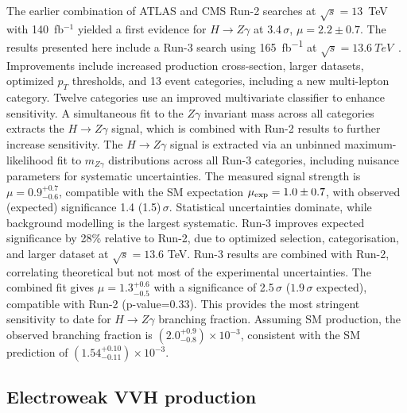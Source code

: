 \documentclass[a4paper,11pt]{article}
\begin{document}
The earlier combination of ATLAS and CMS Run-2 searches at
$\sqrt{s}=13$~TeV with 140~fb$^{-1}$ yielded a first evidence for $H
\to Z\gamma$ at 3.4\,$\sigma$, $\mu = 2.2 \pm 0.7$. The results
presented here include a Run-3 search using \SI{165}{fb^{-1}} at
$\sqrt{s}=\SI{13.6}{TeV}$~\cite{hzgamma-atlas}. Improvements include
increased production cross-section, larger datasets, optimized $p_T$
thresholds, and 13 event categories, including a new multi-lepton
category. Twelve categories use an improved multivariate classifier to
enhance sensitivity. A simultaneous fit to the $Z\gamma$ invariant
mass across all categories extracts the $H \to Z\gamma$ signal, which
is combined with Run-2 results to further increase sensitivity.
%
The $H\to Z\gamma$ signal is extracted via an unbinned
maximum-likelihood fit to $m_{Z\gamma}$ distributions across all Run-3
categories, including nuisance parameters for systematic
uncertainties.  The measured signal strength is $\mu =
0.9^{+0.7}_{-0.6}$, compatible with the SM expectation $\mu_{\rm exp}
= 1.0\pm0.7$, with observed (expected) significance 1.4
(1.5)\,$\sigma$.  Statistical uncertainties dominate, while background
modelling is the largest systematic.  Run-3 improves expected
significance by 28\% relative to Run-2, due to optimized selection,
categorisation, and larger dataset at $\sqrt{s}=13.6$ TeV.  Run-3
results are combined with Run-2, correlating theoretical but not most
of the experimental uncertainties.  The combined fit gives $\mu =
1.3^{+0.6}_{-0.5}$ with a significance of 2.5\,$\sigma$ ($1.9\,\sigma$
expected), compatible with Run-2 (p-value=0.33).  This provides the
most stringent sensitivity to date for $H\to Z\gamma$ branching
fraction.  Assuming SM production, the observed branching fraction is
$(2.0^{+0.9}_{-0.8})\times 10^{-3}$, consistent with the SM prediction
of $(1.54^{+0.10}_{-0.11})\times 10^{-3}$.


\subsection{Electroweak VVH production}
\end{document}
